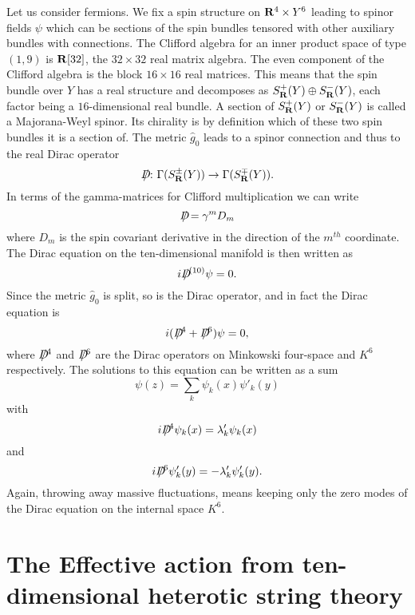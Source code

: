Let us consider fermions.  We fix a spin structure on ${\bf R}^4\times
Y^6$ leading to spinor fields $\psi$ which can be sections of the spin
bundles tensored with other auxiliary bundles with connections. 
The Clifford algebra for an inner product space of type $(1,9)$ is
${\bf R}[32]$, the $32\times 32$ real matrix algebra.  The even
component of the 
Clifford algebra is the block $16\times 16$ real matrices. 
This means that the spin bundle over $Y$ has a real structure and
decomposes as $S^+_{\bf R}(Y)\oplus S^-_{\bf R}(Y)$, each factor being a
$16$-dimensional real bundle.  A section of $S^+_{\bf
R}(Y)$ or $S^-_{\bf R}(Y)$ is called a Majorana-Weyl spinor.
Its chirality is by definition which of these two spin bundles it is a
section of. 
The
metric $\widehat{g}_0$ leads to a spinor connection and thus to the
real Dirac operator 
$$D\hskip-.67em\slash\colon \Gamma(S^\pm_{\bf R}(Y))\to \Gamma(S^\mp_{\bf R}(Y)).$$
In terms of the gamma-matrices for Clifford multiplication
we can write
$$D\hskip-.67em\slash=\gamma^mD_m$$
where $D_m$ is the spin covariant derivative in the direction of the
$m^{th}$ coordinate.  The Dirac equation on the ten-dimensional
manifold is then written as
$$iD\hskip-.67em\slash^{(10)}\psi=0.$$
Since the metric $\widehat{g}_0$ is split, so is the Dirac operator,
and in fact the Dirac equation is
$$i(D\hskip-.67em\slash^4+D\hskip-.67em\slash^6)\psi=0,$$
where $D\hskip-.67em\slash^4$ and $D\hskip-.67em\slash^6$ are the Dirac operators on Minkowski
four-space and $K^6$ respectively.
The solutions to this equation can be written as a sum
$$\psi(z)=\sum_k\psi_k(x)\psi'_k(y)$$
with
$$iD\hskip-.67em\slash^4\psi_k(x)=\lambda'_k\psi_k(x)$$ and
$$iD\hskip-.67em\slash^6\psi_k'(y)=-\lambda'_k\psi'_k(y).$$
Again, throwing away massive fluctuations, means keeping only the zero
modes of the Dirac equation on the internal space $K^6$.

\section{The Effective action from ten-dimensional heterotic string
theory} 

